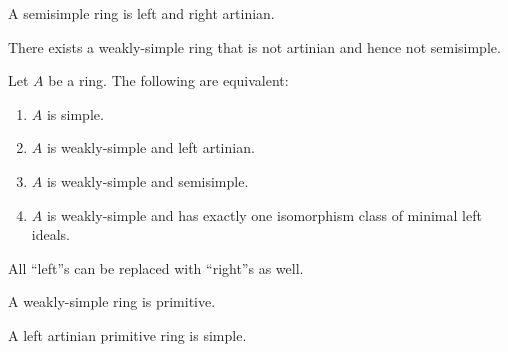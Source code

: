 \documentclass[12pt]{article}
\begin{document}
\begin{thm} \label{thm:semismimple-implies-artinian}
	A semisimple ring is left and right artinian.
\end{thm}

\begin{thm} \label{thm:weakly-simple-not-semisimple}
	There exists a weakly-simple ring that is not artinian and hence not semisimple.
\end{thm}

\begin{thm} \label{thm:simple-equivalences-with-semisimple}
	Let $A$ be a ring. The following are equivalent:
	\begin{enumerate}[label=(\alph*)]
		\item $A$ is simple.
		\item $A$ is weakly-simple and left artinian.
		\item $A$ is weakly-simple and semisimple.
		\item $A$ is weakly-simple and has exactly one isomorphism class of minimal left ideals.
	\end{enumerate}
	All ``left''s can be replaced with ``right''s as well.
\end{thm}

\begin{thm}
	A weakly-simple ring is primitive.
\end{thm}

\begin{thm}
	A left artinian primitive ring is simple.
\end{thm}


\end{document}
